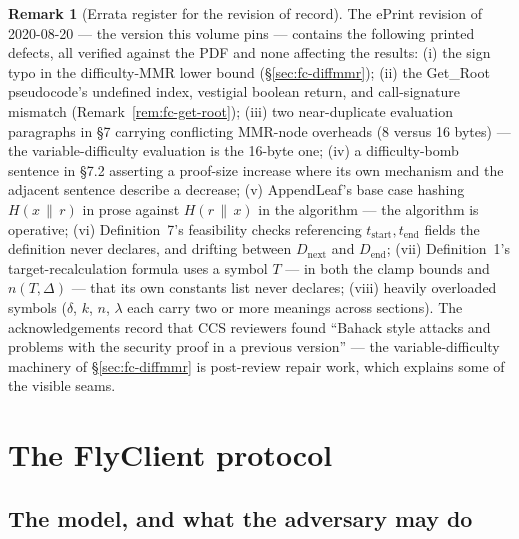 \documentclass[11pt,a4paper]{article}
\theoremstyle{definition}
\newtheorem{remark}[theorem]{Remark}
\begin{document}
\begin{remark}[Errata register for the revision of record]
\label{rem:fc-errata}
The ePrint revision of 2020-08-20 --- the version this volume pins ---
contains the following printed defects, all verified against the PDF and
none affecting the results: (i) the sign typo in the difficulty-MMR lower
bound (\S\ref{sec:fc-diffmmr}); (ii) the \textsf{Get\_Root} pseudocode's
undefined index, vestigial boolean return, and call-signature mismatch
(Remark~\ref{rem:fc-get-root}); (iii) two near-duplicate evaluation
paragraphs in \S7 carrying conflicting MMR-node overheads (8 versus 16
bytes) --- the variable-difficulty evaluation is the 16-byte one; (iv) a
difficulty-bomb sentence in \S7.2 asserting a proof-size increase where
its own mechanism and the adjacent sentence describe a decrease; (v)
\textsf{AppendLeaf}'s base case hashing $H(x \,\|\, r)$ in prose against
$H(r \,\|\, x)$ in the algorithm --- the algorithm is operative; (vi)
Definition~7's feasibility checks referencing $t_{\mathrm{start}},
t_{\mathrm{end}}$ fields the definition never declares, and drifting
between $D_{\mathrm{next}}$ and $D_{\mathrm{end}}$; (vii) Definition~1's
target-recalculation formula uses a symbol $T$ --- in both the clamp bounds
and $n(T,\Delta)$ --- that its own constants list never declares; (viii)
heavily overloaded symbols ($\delta$, $k$, $n$,
$\lambda$ each carry two or more meanings across sections). The
acknowledgements record that CCS reviewers found ``Bahack style attacks
and problems with the security proof in a previous version'' --- the
variable-difficulty machinery of \S\ref{sec:fc-diffmmr} is post-review
repair work, which explains some of the visible seams.
\end{remark}

\section{The FlyClient protocol}\label{sec:fc-protocol}

\subsection{The model, and what the adversary may do}\label{sec:fc-model}
\end{document}
